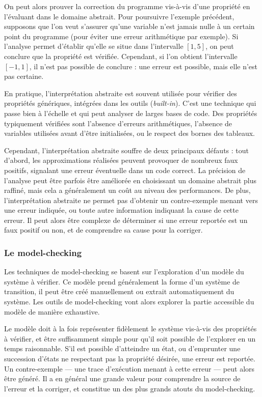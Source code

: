 On peut alors prouver la correction du programme vis-à-vis d'une
propriété en l'évaluant dans le domaine abstrait. Pour poursuivre
l'exemple précédent, supposons que l'on veut s'assurer qu'une variable n'est jamais
nulle à un certain point du programme (pour éviter une erreur arithmétique
par exemple). Si l'analyse permet d'établir qu'elle se situe dans
l'intervalle \([1, 5]\), on peut conclure que la propriété est vérifiée.
Cependant, si l'on obtient l'intervalle \([-1, 1]\), il n'est pas possible
de conclure : une erreur est possible, mais elle n'est pas certaine.

En pratique, l'interprétation abstraite est souvent utilisée pour
vérifier des propriétés génériques, intégrées dans les outils
(\emph{built-in}). C'est une technique qui
passe bien à l'échelle et qui peut analyser de larges bases de code. Des
propriétés typiquement vérifiées sont l'absence d'erreurs arithmétiques,
l'absence de variables utilisées avant d'être initialisées, ou le
respect des bornes des tableaux.

Cependant, l'interprétation abstraite souffre de deux principaux défauts
: tout d'abord, les approximations réalisées peuvent provoquer de
nombreux faux positifs, signalant une erreur éventuelle dans un code
correct. La précision de l'analyse peut être parfois être améliorée en
choisissant un domaine abstrait plus raffiné, mais cela a généralement
un coût au niveau des performances. De plus, l'interprétation abstraite
ne permet pas d'obtenir un contre-exemple menant vers une erreur
indiquée, ou toute autre information indiquant la cause de cette erreur.
Il peut alors être complexe de déterminer si une erreur reportée est un
faux positif ou non, et de comprendre sa cause pour la corriger.

\subsubsection{Le model-checking}

Les techniques de model-checking se basent sur l'exploration d'un modèle
du système à vérifier. Ce modèle prend généralement la forme d'un
système de transition, il peut être créé manuellement ou extrait
automatiquement du système. Les outils de model-checking vont alors
explorer la partie accessible du modèle de manière exhaustive.

Le modèle doit à la fois représenter fidèlement le système vis-à-vis des
propriétés à vérifier, et être suffisamment simple pour qu'il soit
possible de l'explorer en un temps raisonnable. S’il est possible
d'atteindre un état, ou d'emprunter une succession d'états ne respectant
pas la propriété désirée, une erreur est reportée. Un contre-exemple ---
une trace d'exécution menant à cette erreur --- peut alors être généré.
Il a en général une grande valeur pour comprendre la source de l'erreur
et la corriger, et constitue un des plus grands atouts du model-checking.

